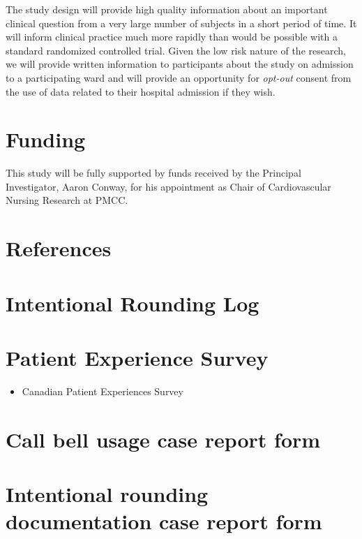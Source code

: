 \documentclass[12pt]{article}
\begin{document}
The study design will provide high quality information about an important clinical question from a very large number of subjects in a short period of time. It will inform clinical practice much more rapidly than would be possible with a standard randomized controlled trial. Given the low risk nature of the research, we will provide written information to participants about the study on admission to a participating ward and will provide an opportunity for \textit{opt-out} consent from the use of data related to their hospital admission if they wish. 
 
\section{Funding}
This study will be fully supported by funds received by the Principal Investigator, Aaron Conway, for his appointment as Chair of Cardiovascular Nursing Research at PMCC.

\newpage
\section{References}




\begin{appendices}

\newpage
\section{Intentional Rounding Log}
\label{AppA}

\newpage
\section{Patient Experience Survey}
\begin{itemize}
    \item Canadian Patient Experiences Survey 
\end{itemize}


\label{AppB}

\newpage
\section{Call bell usage case report form}
\label{AppC}

\newpage
\section{Intentional rounding documentation case report form}
\label{AppD}

\end{appendices}
\end{document}
